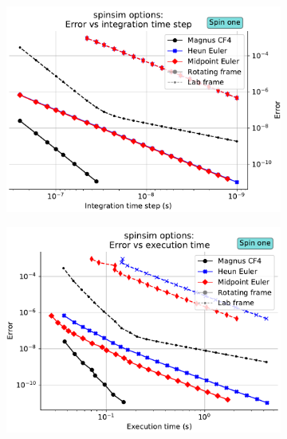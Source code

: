 \documentclass{jors}
\begin{document}
			\begin{figure}[h!]
				\begin{subfigure}[b]{0.475\textwidth}
					\includegraphics[scale=0.475]{benchmark_spin_one_step_error.pdf}
					\caption{}
					\label{fig:benchmark_spin_one_step_error}
				\end{subfigure}
				\hfill
				\begin{subfigure}[b]{0.475\textwidth}
					\includegraphics[scale=0.475]{benchmark_spin_one_execution_error.pdf}
					\caption{}
					\label{fig:benchmark_spin_one_execution_error}
				\end{subfigure}\

\end{figure}
\end{document}

